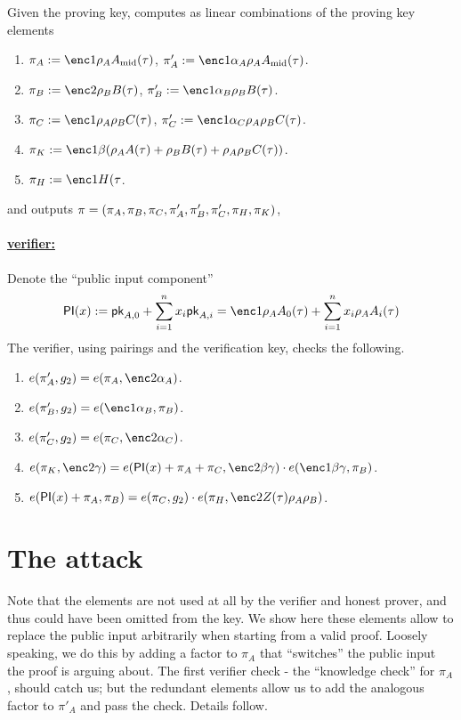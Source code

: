 \documentclass[11pt]{article}
\numberwithin{figure}{section} %
\begin{document}
Given the proving key, \per computes as linear combinations of the proving key elements
\begin{enumerate}
\item $\pi_A\defeq \enc1{\rho_A \Amid(\tau)}$, $\pi'_A\defeq \enc1{\alpha_A\rho_A \Amid(\tau)}$.
\item $\pi_B\defeq \enc2{\rho_B B(\tau)}$, $\pi'_B \defeq \enc1{\alpha_B\rho_B B(\tau)}$.
\item $\pi_C\defeq \enc1{\rho_A\rho_B C(\tau)}$, $\pi'_C \defeq \enc1{\alpha_C\rho_A\rho_B C(\tau)}$.
\item $\pi_K\defeq \enc1{\beta(\rho_A A(\tau) + \rho_B B(\tau) + \rho_A\rho_B C(\tau))}$.
\item $\pi_H\defeq \enc1{H(\tau}$.
 \end{enumerate}
 and outputs $\pi = (\pi_A,\pi_B,\pi_C,\pi'_A,\pi'_B,\pi'_C,\pi_H,\pi_K)$,
 

\paragraph{\underline{\bctv verifier:}\\}
Denote the ``public input component'' 
\[ \PI(x) \defeq \pk_{A,0} + \sum_{i=1}^n x_i \pk_{A,i} = \enc1{\rho_A A_0(\tau) + \sum_{i=1}^n x_i \rho_A A_i(\tau) }\]
 The verifier, using pairings and the verification key, checks the following.
\begin{enumerate}
 \item $e(\pi'_A,g_2)=e(\pi_A,\enc2{\alpha_A})$.
\item $e(\pi'_B, g_2)=e(\enc1{\alpha_B},\pi_B)$.
\item $e(\pi'_C,g_2)=e(\pi_C,\enc2{\alpha_C})$.
\item $e(\pi_K,\enc2{\gamma})=e(\PI(x)+\pi_A+\pi_C,\enc2{\beta\gamma})\cdot e(\enc1{\beta\gamma},\pi_B)$.
\item $e(\PI(x)+\pi_A,\pi_B)= e(\pi_C,g_2)\cdot e(\pi_H,\enc2{Z(\tau)\rho_A\rho_B})$.
 \end{enumerate}
 
 \section{The attack}\label{sec:attack}
 Note that the elements  are not used at all by the verifier and honest prover, and thus could have been omitted from the key. We show here these elements allow to replace the public input arbitrarily when starting from a valid proof.
 Loosely speaking, we do this by adding a factor to $\pi_A$ that ``switches'' the public input the proof is arguing about.
 The first verifier check - the ``knowledge check'' for $\pi_A$, should catch us; but the redundant elements allow us to add
 the analogous factor to $\pi'_A$ and pass the check. Details follow.
 
\end{document}
